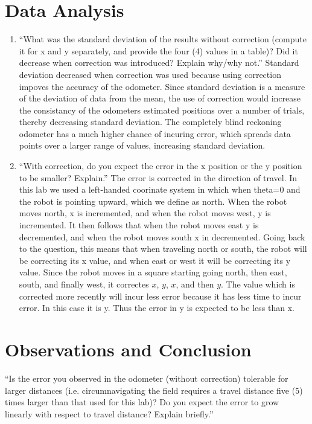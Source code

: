 \documentclass[twocolumn]{article}
\begin{document}
\section{Data Analysis}

\begin{enumerate}
\item ``What was the standard deviation of the results without correction (compute it for x and y separately, and provide the four (4) values in a table)? Did it decrease when correction was introduced? Explain why/why not.\cite{lab2}'' Standard deviation decreased when correction was used because using correction impoves the accuracy of the odometer. Since standard deviation is a measure of the deviation of data from the mean, the use of correction would increase the consistancy of the odometers estimated positions over a number of trials, thereby decreasing standard deviation. The completely blind reckoning odometer has a much higher chance of incuring error, which spreads data points over a larger range of values, increasing standard deviation.
\item ``With correction, do you expect the error in the x position or the y position to be smaller? Explain.'' The error is corrected in the direction of travel. In this lab we used a left-handed coorinate system in which when theta=0 and the robot is pointing upward, which we define as north. When the robot moves north, x is incremented, and when the robot moves west, y is incremented. It then follows that when the robot moves east y is decremented, and when the robot moves south x in decremented. Going back to the question, this means that when traveling north or south, the robot will be correcting its x value, and when east or west it will be correcting its y value. Since the robot moves in a square starting going north, then east, south, and finally west, it correctes $x$, $y$, $x$, and then $y$. The value which is corrected more recently will incur less error because it has less time to incur error. In this case it is y. Thus the error in y is expected to be less than x.
\end{enumerate}

\section{Observations and Conclusion}

``Is the error you observed in the odometer (without correction) tolerable for larger distances (i.e. circumnavigating the field requires a travel distance five (5) times larger than that used for this lab)? Do you expect the error to grow linearly with respect to travel distance? Explain briefly.\cite{lab2}''
\end{document}

